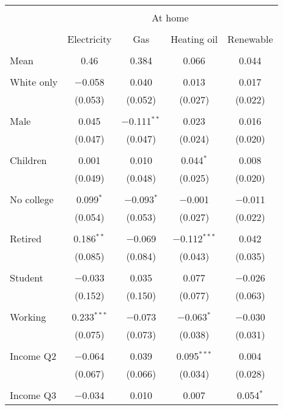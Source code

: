 
\begin{tabular}{@{\extracolsep{5pt}}lcccc} 
\\[-1.8ex]\hline 
\hline \\[-1.8ex] 
 & \multicolumn{4}{c}{At home} \\ 
\cline{2-5} 
\\[-1.8ex] & Electricity & Gas & Heating oil & Renewable \\ 
\hline \\[-1.8ex] 
 Mean & 0.46 & 0.384 & 0.066 & 0.044  \\ \hline \\[-1.8ex] White only & $-$0.058 & 0.040 & 0.013 & 0.017 \\ 
  & (0.053) & (0.052) & (0.027) & (0.022) \\ 
  & & & & \\ 
 Male & 0.045 & $-$0.111$^{**}$ & 0.023 & 0.016 \\ 
  & (0.047) & (0.047) & (0.024) & (0.020) \\ 
  & & & & \\ 
 Children & 0.001 & 0.010 & 0.044$^{*}$ & 0.008 \\ 
  & (0.049) & (0.048) & (0.025) & (0.020) \\ 
  & & & & \\ 
 No college & 0.099$^{*}$ & $-$0.093$^{*}$ & $-$0.001 & $-$0.011 \\ 
  & (0.054) & (0.053) & (0.027) & (0.022) \\ 
  & & & & \\ 
 Retired & 0.186$^{**}$ & $-$0.069 & $-$0.112$^{***}$ & 0.042 \\ 
  & (0.085) & (0.084) & (0.043) & (0.035) \\ 
  & & & & \\ 
 Student & $-$0.033 & 0.035 & 0.077 & $-$0.026 \\ 
  & (0.152) & (0.150) & (0.077) & (0.063) \\ 
  & & & & \\ 
 Working & 0.233$^{***}$ & $-$0.073 & $-$0.063$^{*}$ & $-$0.030 \\ 
  & (0.075) & (0.073) & (0.038) & (0.031) \\ 
  & & & & \\ 
 Income Q2 & $-$0.064 & 0.039 & 0.095$^{***}$ & 0.004 \\ 
  & (0.067) & (0.066) & (0.034) & (0.028) \\ 
  & & & & \\ 
 Income Q3 & $-$0.034 & 0.010 & 0.007 & 0.054$^{*}$ \\ 

\end{tabular}
